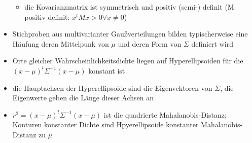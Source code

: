 \documentclass{article} %
\begin{document}
\begin{itemize}
\begin{itemize}
				\item die Kovarianzmatrix ist symmetrisch und positiv (semi-) definit (M positiv definit: $x^tMx>0 \forall x \neq0$)
			\end{itemize}
			\item Stichproben aus multivarianter Gaußverteilungen bilden typischerweise eine Häufung deren Mittelpunk von $\mu$ und deren Form von $\Sigma$ definiert wird
			\item Orte gleicher Wahrscheinlichkeitsdichte liegen auf Hyperellipsoiden für die $(x-\mu)^t\Sigma^{-1}(x-\mu)$ konstant ist
			\item die Hauptachsen der Hyperellipsoide sind die Eigenvektoren von $\Sigma$, die Eigenwerte geben die Länge dieser Achsen an
			\item $r^2 = (x-\mu)^t\Sigma^{-1}(x-\mu)$ ist die quadrierte Mahalanobis-Distanz; Konturen konstanter Dichte sind Hpyerellipsoide konstanter Mahalanobis-Distanz zu $\mu$
		\end{itemize}
\end{document}
